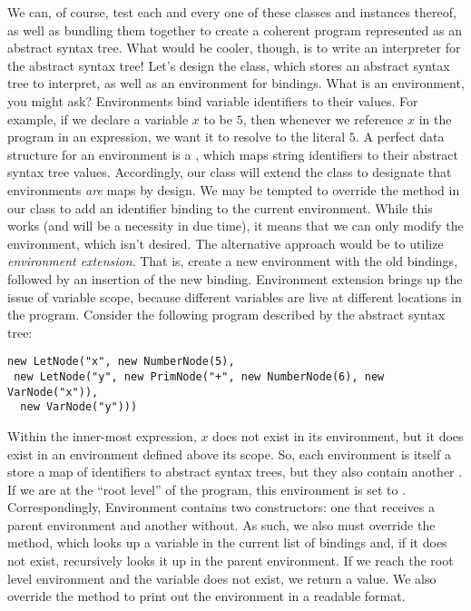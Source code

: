 We can, of course, test each and every one of these classes and instances thereof, as well as bundling them together to create a coherent program represented as an abstract syntax tree. What would be cooler, though, is to write an interpreter for the abstract syntax tree! Let's design the  class, which stores an abstract syntax tree to interpret, as well as an environment for bindings. What is an environment, you might ask? Environments bind variable identifiers to their values. For example, if we declare a variable $x$ to be $5$, then whenever we reference $x$ in the program in an expression, we want it to resolve to the literal $5$. A perfect data structure for an environment is a , which maps string identifiers to their abstract syntax tree values. Accordingly, our  class will extend the  class to designate that environments \textit{are} maps by design. We may be tempted to override the  method in our  class to add an identifier binding to the current environment. While this works (and will be a necessity in due time), it means that we can only modify the environment, which isn't desired. The alternative approach would be to utilize \textit{environment extension}. That is, create a new environment with the old bindings, followed by an insertion of the new binding. Environment extension brings up the issue of variable scope, because different variables are live at different locations in the program. Consider the following program described by the abstract syntax tree:

\begin{verbatim}
new LetNode("x", new NumberNode(5), 
 new LetNode("y", new PrimNode("+", new NumberNode(6), new VarNode("x")), 
  new VarNode("y")))
\end{verbatim}

Within the inner-most  expression, $x$ does not exist in its environment, but it does exist in an environment defined above its scope. So, each environment is itself a store a map of identifiers to abstract syntax trees, but they also contain another . If we are at the ``root level'' of the program, this environment is set to . Correspondingly, Environment contains two constructors: one that receives a parent environment and another without. As such, we also must override the  method, which looks up a variable in the current list of bindings and, if it does not exist, recursively looks it up in the parent environment. If we reach the root level environment and the variable does not exist, we return a  value. We also override the  method to print out the environment in a readable format.

